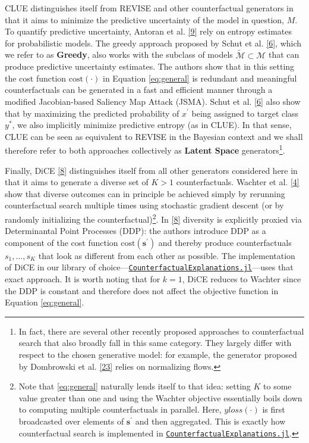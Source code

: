 \documentclass[conference,final,]{IEEEtran}
\theoremstyle{definition}
\theoremstyle{definition}
\theoremstyle{definition}
\theoremstyle{definition}
\theoremstyle{remark}
\begin{document}
CLUE distinguishes itself from REVISE and other counterfactual generators in that it aims to minimize the predictive uncertainty of the model in question, \(M\). To quantify predictive uncertainty, Antoran et al. \protect\hyperlink{ref-antoran2020getting}{{[}9{]}} rely on entropy estimates for probabilistic models. The greedy approach proposed by Schut et al. \protect\hyperlink{ref-schut2021generating}{{[}6{]}}, which we refer to as \textbf{Greedy}, also works with the subclass of models \(\tilde{\mathcal{M}}\subset\mathcal{M}\) that can produce predictive uncertainty estimates. The authors show that in this setting the cost function \(\text{cost}(\cdot)\) in Equation \eqref{eq:general} is redundant and meaningful counterfactuals can be generated in a fast and efficient manner through a modified Jacobian-based Saliency Map Attack (JSMA). Schut et al. \protect\hyperlink{ref-schut2021generating}{{[}6{]}} also show that by maximizing the predicted probability of \(x^\prime\) being assigned to target class \(y^*\), we also implicitly minimize predictive entropy (as in CLUE). In that sense, CLUE can be seen as equivalent to REVISE in the Bayesian context and we shall therefore refer to both approaches collectively as \textbf{Latent Space} generators\footnote{In fact, there are several other recently proposed approaches to counterfactual search that also broadly fall in this same category. They largely differ with respect to the chosen generative model: for example, the generator proposed by Dombrowski et al. \protect\hyperlink{ref-dombrowski2021diffeomorphic}{{[}23{]}} relies on normalizing flows.}.

Finally, DiCE \protect\hyperlink{ref-mothilal2020explaining}{{[}8{]}} distinguishes itself from all other generators considered here in that it aims to generate a diverse set of \(K>1\) counterfactuals. Wachter et al. \protect\hyperlink{ref-wachter2017counterfactual}{{[}4{]}} show that diverse outcomes can in principle be achieved simply by rerunning counterfactual search multiple times using stochastic gradient descent (or by randomly initializing the counterfactual)\footnote{Note that \eqref{eq:general} naturally lends itself to that idea: setting \(K\) to some value greater than one and using the Wachter objective essentially boils down to computing multiple counterfactuals in parallel. Here, \(yloss(\cdot)\) is first broadcasted over elements of \(\mathbf{s}^\prime\) and then aggregated. This is exactly how counterfactual search is implemented in \href{https://github.com/pat-alt/CounterfactualExplanations.jl}{\texttt{CounterfactualExplanations.jl}}.}. In \protect\hyperlink{ref-mothilal2020explaining}{{[}8{]}} diversity is explicitly proxied via Determinantal Point Processes (DDP): the authors introduce DDP as a component of the cost function \(\text{cost}(\mathbf{s}^\prime)\) and thereby produce counterfactuals \(s_1, ..., s_K\) that look as different from each other as possible. The implementation of DiCE in our library of choice---\href{https://github.com/pat-alt/CounterfactualExplanations.jl}{\texttt{CounterfactualExplanations.jl}}---uses that exact approach. It is worth noting that for \(k=1\), DiCE reduces to Wachter since the DDP is constant and therefore does not affect the objective function in Equation \eqref{eq:general}.
\end{document}
